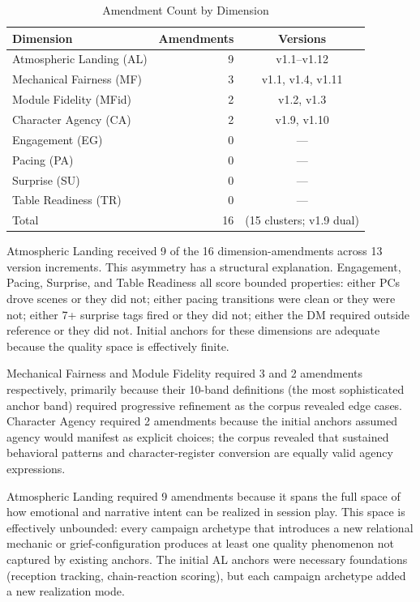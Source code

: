 \begin{table}[t]
\caption{Amendment Count by Dimension}
\label{tab:dimension-distribution}
\begin{tabular}{@{}lrc@{}}
\toprule
Dimension & Amendments & Versions \\
\midrule
Atmospheric Landing (AL)  & 9 & v1.1--v1.12 \\
Mechanical Fairness (MF)  & 3 & v1.1, v1.4, v1.11 \\
Module Fidelity (MFid)    & 2 & v1.2, v1.3 \\
Character Agency (CA)     & 2 & v1.9, v1.10 \\
Engagement (EG)           & 0 & --- \\
Pacing (PA)               & 0 & --- \\
Surprise (SU)             & 0 & --- \\
Table Readiness (TR)      & 0 & --- \\
\midrule
Total                     & 16 & (15 clusters; v1.9 dual) \\
\bottomrule
\end{tabular}
\end{table}

Atmospheric Landing received 9 of the 16 dimension-amendments across 13 version
increments. This asymmetry has a structural explanation. Engagement, Pacing,
Surprise, and Table Readiness all score bounded properties: either PCs drove
scenes or they did not; either pacing transitions were clean or they were not;
either 7+ surprise tags fired or they did not; either the DM required outside
reference or they did not. Initial anchors for these dimensions are adequate
because the quality space is effectively finite.

Mechanical Fairness and Module Fidelity required 3 and 2 amendments respectively,
primarily because their 10-band definitions (the most sophisticated anchor band)
required progressive refinement as the corpus revealed edge cases. Character Agency
required 2 amendments because the initial anchors assumed agency would manifest
as explicit choices; the corpus revealed that sustained behavioral patterns and
character-register conversion are equally valid agency expressions.

Atmospheric Landing required 9 amendments because it spans the full space of
how emotional and narrative intent can be realized in session play. This space is
effectively unbounded: every campaign archetype that introduces a new relational
mechanic or grief-configuration produces at least one quality phenomenon not
captured by existing anchors. The initial AL anchors were necessary foundations
(reception tracking, chain-reaction scoring), but each campaign archetype added
a new realization mode.

